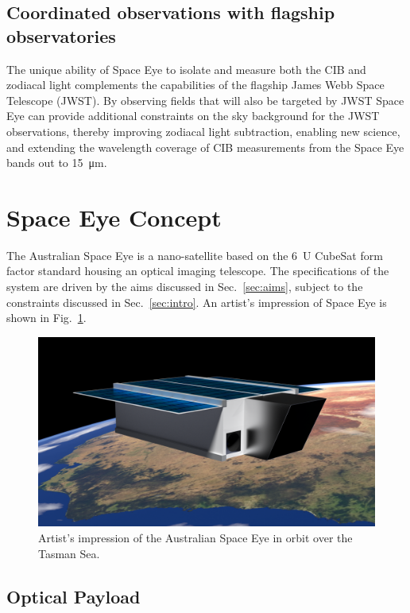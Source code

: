 \documentclass[]{iac}
\begin{document}
\subsection{Coordinated observations with flagship observatories}

The unique ability of Space Eye to isolate and measure both the CIB and zodiacal light complements the capabilities of
the flagship James Webb Space Telescope (JWST). By observing fields that will also be targeted by JWST Space Eye can
provide additional constraints on the sky background for the JWST observations, thereby improving zodiacal light
subtraction, enabling new science, and extending the wavelength coverage of CIB measurements from the Space Eye
bands out to \SI{15}{\micro\metre}.

\section{Space Eye Concept}

The Australian Space Eye is a nano-satellite based on the \SI{6}{U} CubeSat form factor standard\cite{Hevner2011}
housing an optical imaging telescope. The specifications of the system are driven by the aims discussed in
Sec.~\ref{sec:aims}, subject to the constraints discussed in Sec.~\ref{sec:intro}. An artist's impression of Space Eye
is shown in Fig.~\ref{fig:render}.

\begin{figure}[tp]
  \includegraphics[width=\columnwidth]{figures/ASE-2016-a.png}
  \caption{\label{fig:render}Artist's impression of the Australian Space Eye in orbit over the Tasman Sea.}
\end{figure}

\subsection{Optical Payload}
\end{document}
